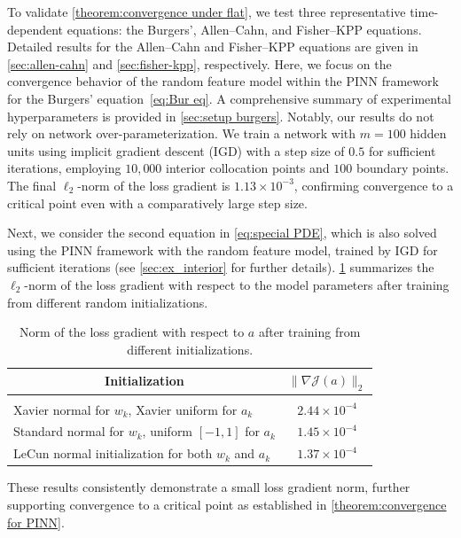 \documentclass{article}
\begin{document}
To validate \cref{theorem:convergence under flat}, we test three representative time-dependent equations:  the Burgers', Allen--Cahn, and Fisher--KPP equations.
Detailed results for the Allen--Cahn and Fisher--KPP equations are given in \cref{sec:allen-cahn} and \cref{sec:fisher-kpp}, respectively.  
Here, we focus on the convergence behavior of the random feature model within the PINN framework for the Burgers’ equation~\cref{eq:Bur eq}.  
A comprehensive summary of experimental hyperparameters is provided in \cref{sec:setup burgers}.
Notably, our results do not rely on network over-parameterization.  
We train a network with $m = 100$ hidden units using implicit gradient descent (IGD) with a step size of $0.5$ for sufficient iterations, employing $10,000$ interior collocation points and $100$ boundary points.  
The final $\ell_2$-norm of the loss gradient is $1.13 \times 10^{-3}$, confirming convergence to a critical point even with a comparatively large step size.

Next, we consider the second equation in \cref{eq:special PDE}, which is also solved using the PINN framework with the random feature model, trained by IGD for sufficient iterations (see \cref{sec:ex_interior} for further details).
\cref{tab:interior_loss_grad} summarizes the $\ell_2$-norm of the loss gradient with respect to the model parameters after training from different random initializations.
\begin{table}[h]
\caption{Norm of the loss gradient with respect to $a$ after training from different initializations.}
\label{tab:interior_loss_grad}
\begin{center}
\begin{tabular}{lc}
\multicolumn{1}{c}{\bf Initialization} & \multicolumn{1}{c}{$\|\nabla \mathcal{J}(a)\|_2$} \\
\hline \\
Xavier normal for $w_k$, Xavier uniform for $a_k$ & $2.44 \times 10^{-4}$ \\
Standard normal for $w_k$, uniform $[-1,1]$ for $a_k$ & $1.45 \times 10^{-4}$ \\
LeCun normal initialization for both $w_k$ and $a_k$& $1.37 \times 10^{-4}$ \\
\end{tabular}
\end{center}
\end{table}

These results consistently demonstrate a small loss gradient norm, further supporting convergence to a critical point as established in \cref{theorem:convergence for PINN}.
\end{document}
